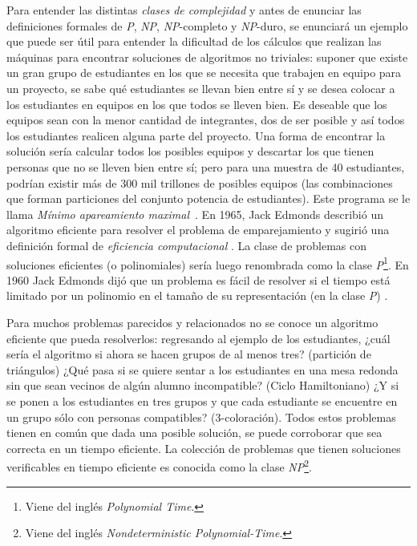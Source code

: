 Para entender las distintas \textit{clases de complejidad} y antes de enunciar
las definiciones formales de \textsl{P}, \textsl{NP}, \textsl{NP}-completo y
\textsl{NP}-duro, se enunciará un ejemplo que puede ser útil para entender la
dificultad de los cálculos que realizan las máquinas para encontrar soluciones
de algoritmos no triviales: suponer que existe un gran grupo de estudiantes
en los que se necesita que trabajen en equipo para un proyecto, se sabe qué
estudiantes se llevan bien entre sí y se desea colocar a los estudiantes en
equipos en los que todos se lleven bien. Es deseable que los equipos sean con la menor cantidad de
integrantes, dos de ser posible y así todos los estudiantes realicen alguna
parte del proyecto. Una forma de encontrar la solución sería calcular todos los
posibles equipos y descartar los que tienen personas que no se lleven 
bien entre sí; pero para una muestra de 40 estudiantes, podrían existir más de
300 mil trillones de posibles equipos (las combinaciones que forman particiones
del conjunto potencia de estudiantes). Este programa se le llama \textit{Mínimo
  apareamiento maximal}~\cite{10.1007/978-3-540-79228-4_32}.  En 1965, Jack
Edmonds describió un algoritmo eficiente para resolver el problema de
emparejamiento y sugirió una definición formal de \textit{eficiencia
  computacional} \cite{Mathematics}. La clase de problemas con soluciones
eficientes (o polinomiales) sería luego renombrada como la clase \textsl{P}\footnote{Viene del
  inglés \textit{Polynomial Time}.}. En 1960 Jack Edmonds dijó que un problema es fácil 
  de resolver si el tiempo está limitado por un polinomio en el tamaño de su representación 
  (en la clase \textsl{P}) \cite{sc-ale}.

Para muchos problemas parecidos y relacionados no se conoce un algoritmo
eficiente que pueda resolverlos: regresando al ejemplo de los estudiantes, ¿cuál
sería el algoritmo si ahora se hacen grupos de al menos tres? (partición de triángulos)
¿Qué pasa si se quiere sentar a los estudiantes en una mesa redonda sin que sean
vecinos de algún alumno incompatible? (Ciclo Hamiltoniano) ¿Y si se ponen a los
estudiantes en tres grupos y que cada estudiante se encuentre en un grupo sólo
con personas compatibles? (3-coloración).  Todos estos problemas tienen en común
que dada una posible solución, se puede corroborar que sea correcta en un tiempo
eficiente.  La colección de problemas que tienen soluciones verificables en
tiempo eficiente es conocida como la clase \textsl{NP}\footnote{Viene del inglés
  \textit{ Nondeterministic Polynomial-Time}.}.

